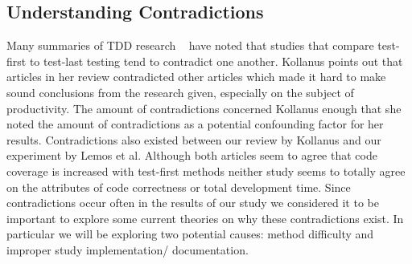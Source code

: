 \documentclass{sig-alternate}
\begin{document}

\subsection{Understanding Contradictions}
Many summaries of TDD research ~\cite{Hammond:2012, Hellman:2012, Kettunen:2010, Kollanus:2010} have noted that studies that compare test-first to test-last testing tend to contradict one another.  Kollanus points out that articles in her review contradicted other articles which made it hard to make sound conclusions from the research given, especially on the subject of productivity.  The amount of contradictions concerned Kollanus enough that she noted the amount of contradictions as a potential confounding factor for her results.  Contradictions also existed between our review by Kollanus and our experiment by Lemos et al.  Although both articles seem to agree that code coverage is increased with test-first methods neither study seems to totally agree on the attributes of code correctness or total development time.  Since contradictions occur often in the results of our study we considered it to be important to explore some current theories on why these contradictions exist.  In particular we will be exploring two potential causes: method difficulty and improper study implementation/ documentation.
\end{document}
